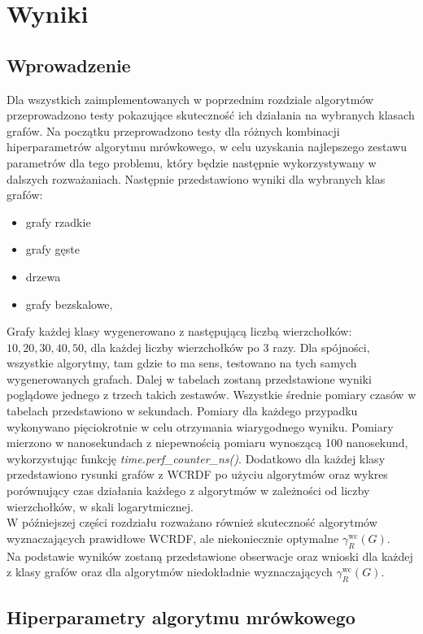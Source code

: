 \chapter{Wyniki}

\section{Wprowadzenie}

Dla wszystkich zaimplementowanych w poprzednim rozdziale algorytmów przeprowadzono testy pokazujące skuteczność ich działania na wybranych klasach grafów. Na początku przeprowadzono testy dla różnych kombinacji hiperparametrów algorytmu mrówkowego, w celu uzyskania najlepszego zestawu parametrów dla tego problemu, który będzie następnie wykorzystywany w dalszych rozważaniach. Następnie przedstawiono wyniki dla wybranych klas grafów:
\begin{itemize}
    \item grafy rzadkie
    \item grafy gęste
    \item drzewa
    \item grafy bezskalowe,
\end{itemize}
Grafy każdej klasy wygenerowano z następującą liczbą wierzchołków: ${10, 20, 30, 40, 50}$, dla każdej liczby wierzchołków po 3 razy. Dla spójności, wszystkie algorytmy, tam gdzie to ma sens, testowano na tych samych wygenerowanych grafach. Dalej w tabelach zostaną przedstawione wyniki poglądowe jednego z trzech takich zestawów. 
Wszystkie średnie pomiary czasów w tabelach przedstawiono w sekundach. Pomiary dla każdego przypadku wykonywano pięciokrotnie w celu otrzymania wiarygodnego wyniku. Pomiary mierzono w nanosekundach z niepewnością pomiaru wynoszącą 100 nanosekund, wykorzystując funkcję \textit{time.perf\_counter\_ns()}. Dodatkowo dla każdej klasy przedstawiono rysunki grafów z WCRDF po użyciu algorytmów oraz wykres porównujący czas działania każdego z algorytmów w zależności od liczby wierzchołków, w skali logarytmicznej.\\
W późniejszej części rozdziału rozważano również skuteczność algorytmów wyznaczających prawidłowe WCRDF, ale niekoniecznie optymalne $\gamma^{\text{wc}}_R(G)$.\\
Na podstawie wyników zostaną przedstawione obserwacje oraz wnioski dla każdej z klasy grafów oraz dla algorytmów niedokładnie wyznaczających $\gamma^{\text{wc}}_R(G)$.

\section{Hiperparametry algorytmu mrówkowego}


